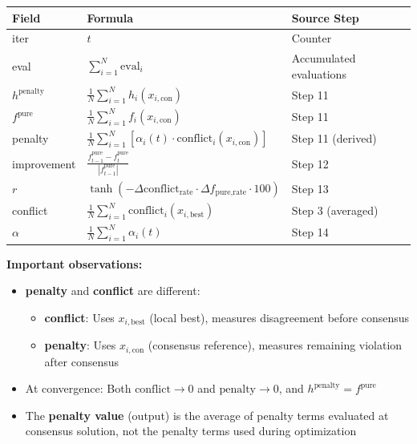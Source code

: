 \documentclass[11pt,a4paper]{article}
\begin{document}
\begin{itemize}
\begin{center}
\begin{tabular}{|l|l|l|}
\hline
\textbf{Field} & \textbf{Formula} & \textbf{Source Step} \\
\hline
iter & $t$ & Counter \\
\hline
eval & $\sum_{i=1}^N \text{eval}_i$ & Accumulated evaluations \\
\hline
$h^{\text{penalty}}$ & $\frac{1}{N}\sum_{i=1}^N h_i(x_{i,\text{con}})$ & Step 11 \\
\hline
$f^{\text{pure}}$ & $\frac{1}{N}\sum_{i=1}^N f_i(x_{i,\text{con}})$ & Step 11 \\
\hline
penalty & $\frac{1}{N}\sum_{i=1}^N [\alpha_i(t) \cdot \text{conflict}_i(x_{i,\text{con}})]$ & Step 11 (derived) \\
\hline
improvement & $\frac{f_{t-1}^{\text{pure}} - f_t^{\text{pure}}}{|f_{t-1}^{\text{pure}}|}$ & Step 12 \\
\hline
$r$ & $\tanh\!\left(-\Delta\text{conflict}_{\text{rate}}\cdot\Delta f_{\text{pure,rate}}\cdot100\right)$ & Step 13 \\
\hline
conflict & $\frac{1}{N}\sum_{i=1}^N \text{conflict}_i(x_{i,\text{best}})$ & Step 3 (averaged) \\
\hline
$\alpha$ & $\frac{1}{N}\sum_{i=1}^N \alpha_i(t)$ & Step 14 \\
\hline
\end{tabular}
\end{center}

\textbf{Important observations:}
\begin{itemize}
    \item \textbf{penalty} and \textbf{conflict} are different:
    \begin{itemize}
        \item \textbf{conflict}: Uses $x_{i,\text{best}}$ (local best), measures disagreement before consensus
        \item \textbf{penalty}: Uses $x_{i,\text{con}}$ (consensus reference), measures remaining violation after consensus
    \end{itemize}
    \item At convergence: Both $\text{conflict} \to 0$ and $\text{penalty} \to 0$, and $h^{\text{penalty}} = f^{\text{pure}}$
    \item The \textbf{penalty value} (output) is the average of penalty terms evaluated at consensus solution, not the penalty terms used during optimization
\end{itemize}


\end{itemize}
\end{document}
